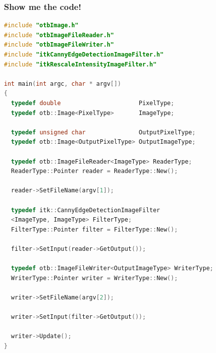 \documentclass[8pt]{beamer}
\begin{document}
\begin{frame}[fragile]
\frametitle{Show me the code!}
\begin{lstlisting}[language=c++,breaklines=true,breakatwhitespace=true,frame = tb,framerule = 0.25pt,fontadjust,backgroundcolor={\color{listlightgray}},basicstyle = {\ttfamily\tiny},keywordstyle = {\ttfamily\color{listkeyword}\textbf},identifierstyle = {\ttfamily},commentstyle = {\ttfamily\color{listcomment}\textit},stringstyle = {\ttfamily},showstringspaces = false,showtabs = false,numbers = none,numbersep = 2pt, numberstyle={\ttfamily\color{listnumbers}},tabsize = 2]
#include "otbImage.h"
#include "otbImageFileReader.h"
#include "otbImageFileWriter.h"
#include "itkCannyEdgeDetectionImageFilter.h"
#include "itkRescaleIntensityImageFilter.h"

int main(int argc, char * argv[])
{
  typedef double                      PixelType;
  typedef otb::Image<PixelType>       ImageType;
  
  typedef unsigned char               OutputPixelType;
  typedef otb::Image<OutputPixelType> OutputImageType;

  typedef otb::ImageFileReader<ImageType> ReaderType;
  ReaderType::Pointer reader = ReaderType::New();

  reader->SetFileName(argv[1]);

  typedef itk::CannyEdgeDetectionImageFilter
  <ImageType, ImageType> FilterType;
  FilterType::Pointer filter = FilterType::New();

  filter->SetInput(reader->GetOutput());

  typedef otb::ImageFileWriter<OutputImageType> WriterType;
  WriterType::Pointer writer = WriterType::New();

  writer->SetFileName(argv[2]);
  
  writer->SetInput(filter->GetOutput());

  writer->Update();
}
\end{lstlisting}
\end{frame}
\end{document}
